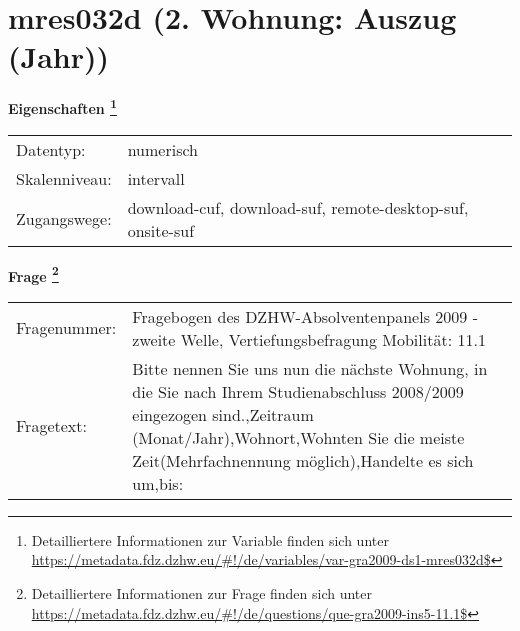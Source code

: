 
    \setcounter{footnote}{0}

    \vspace*{-1.8cm}
	\section{mres032d (2. Wohnung: Auszug (Jahr))}
	\label{section:mres032d}



    \vspace*{0.5cm}
    \noindent\textbf{Eigenschaften
	\footnote{Detailliertere Informationen zur Variable finden sich unter
		\url{https://metadata.fdz.dzhw.eu/\#!/de/variables/var-gra2009-ds1-mres032d$}}}\\
	\begin{tabularx}{\hsize}{@{}lX}
	Datentyp: & numerisch \\
	Skalenniveau: & intervall \\
	Zugangswege: &
	  download-cuf, 
	  download-suf, 
	  remote-desktop-suf, 
	  onsite-suf
 \\
    \end{tabularx}



				\vspace*{0.5cm}
                \noindent\textbf{Frage
	                \footnote{Detailliertere Informationen zur Frage finden sich unter
		              \url{https://metadata.fdz.dzhw.eu/\#!/de/questions/que-gra2009-ins5-11.1$}}}\\
				\begin{tabularx}{\hsize}{@{}lX}
					Fragenummer: &
					  Fragebogen des DZHW-Absolventenpanels 2009 - zweite Welle, Vertiefungsbefragung Mobilität:
					  11.1
 \\
					Fragetext: & Bitte nennen Sie uns nun die nächste Wohnung, in die Sie nach Ihrem Studienabschluss 2008/2009 eingezogen sind.,Zeitraum (Monat/Jahr),Wohnort,Wohnten Sie die meiste Zeit(Mehrfachnennung möglich),Handelte es sich um,bis: \\
				\end{tabularx}





